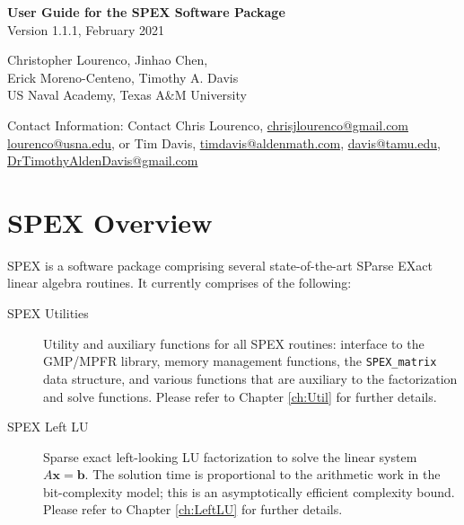 \documentclass[12pt]{report}
\theoremstyle{definition}
\begin{document}
\begin{center}
\begin{large}
\textbf{User Guide for the SPEX Software Package} \\
\vspace{5mm}
Version 1.1.1, February 2021 %
\vspace{20mm}

Christopher Lourenco, Jinhao Chen, \\ Erick Moreno-Centeno, Timothy A. Davis \\

US Naval Academy, Texas A\&M University

\vspace{20mm}
Contact Information: Contact Chris Lourenco, \href{mailto:chrisjlourenco@gmail.com}{chrisjlourenco@gmail.com} \href{mailto:lourenco@usna.edu}{lourenco@usna.edu}, or Tim Davis,
\href{mailto:timdavis@aldenmath.com}{timdavis@aldenmath.com},
\href{mailto:davis@tamu.edu}{davis@tamu.edu},
\href{DrTimothyAldenDavis@gmail.com}{DrTimothyAldenDavis@gmail.com}

\end{large}
\end{center}

\newpage
\tableofcontents

\newpage
    
\chapter{SPEX Overview}

SPEX is a software package comprising several state-of-the-art SParse EXact linear algebra routines. It currently comprises of the following:
	\begin{description}
	\item[SPEX Utilities] Utility and auxiliary functions for all SPEX routines: interface to the GMP/MPFR library, memory management functions, the \verb|SPEX_matrix| data structure, and various functions that are auxiliary to the factorization and solve functions. Please refer to Chapter \ref{ch:Util} for further details.
	\item[SPEX Left LU] Sparse exact left-looking LU factorization to solve the linear system $A \mathbf{x} = \mathbf{b}$. The solution time is proportional to the arithmetic work in the bit-complexity model; this is an asymptotically efficient complexity bound. Please refer to Chapter \ref{ch:LeftLU} for further details.
	\end{description}
\end{document}
